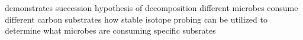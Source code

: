 \begin{itemize}
\Paper demonstrates succession hypothesis of decomposition
\Demonstrates different microbes consume different carbon substrates
\demonstrates how stable isotope probing can be utilized to determine what microbes are consuming specific subsrates
\end{itemize}

